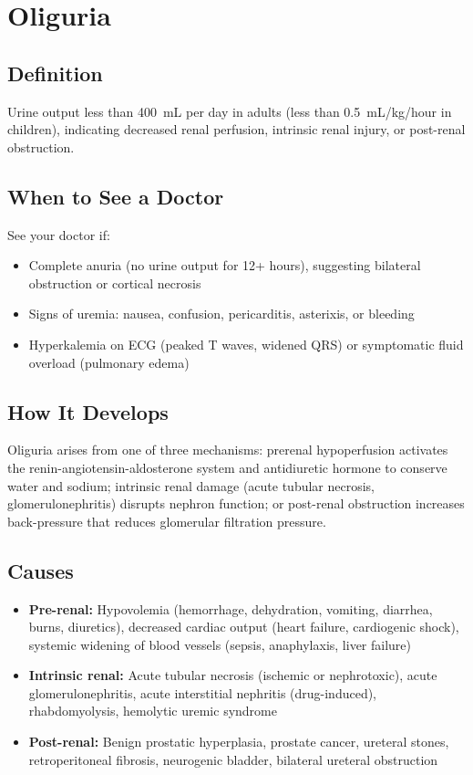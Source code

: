 \chapter{Oliguria}

\section*{Definition}
Urine output less than 400~mL per day in adults (less than 0.5~mL/kg/hour in children), indicating decreased renal perfusion, intrinsic renal injury, or post-renal obstruction.

\section*{When to See a Doctor}
See your doctor if:
\begin{itemize}
  \item Complete anuria (no urine output for 12+ hours), suggesting bilateral obstruction or cortical necrosis
  \item Signs of uremia: nausea, confusion, pericarditis, asterixis, or bleeding
  \item Hyperkalemia on ECG (peaked T waves, widened QRS) or symptomatic fluid overload (pulmonary edema)
\end{itemize}

\section*{How It Develops}
Oliguria arises from one of three mechanisms: prerenal hypoperfusion activates the renin-angiotensin-aldosterone system and antidiuretic hormone to conserve water and sodium; intrinsic renal damage (acute tubular necrosis, glomerulonephritis) disrupts nephron function; or post-renal obstruction increases back-pressure that reduces glomerular filtration pressure.

\section*{Causes}
\begin{itemize}
  \item \textbf{Pre-renal:} Hypovolemia (hemorrhage, dehydration, vomiting, diarrhea, burns, diuretics), decreased cardiac output (heart failure, cardiogenic shock), systemic widening of blood vessels (sepsis, anaphylaxis, liver failure)
  \item \textbf{Intrinsic renal:} Acute tubular necrosis (ischemic or nephrotoxic), acute glomerulonephritis, acute interstitial nephritis (drug-induced), rhabdomyolysis, hemolytic uremic syndrome
  \item \textbf{Post-renal:} Benign prostatic hyperplasia, prostate cancer, ureteral stones, retroperitoneal fibrosis, neurogenic bladder, bilateral ureteral obstruction
\end{itemize}


